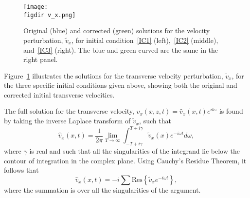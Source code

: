 \documentclass[12pt, draft]{../style-files/ociamthesis}
\begin{document}
%
\begin{figure}
	\texttt{[image: \\figdir v\_x.png]}
	\caption{Original \cite{rae_etal81} (blue) and corrected (green) solutions for the velocity perturbation, $\tilde{v}_x$, for initial condition~\ref{IC1} (left),~\ref{IC2} (middle), and~\ref{IC3} (right). The blue and green curved are the same in the right panel.}
	\label{fig: vx}
\end{figure}
Figure~\ref{fig: vx} illustrates the solutions for the transverse velocity perturbation, $\tilde{v}_x$, for the three specific initial conditions given above, showing both the original and corrected initial transverse velocities.

The full solution for the transverse velocity, $v_x(x, z, t) = \hat{v}_x(x,t)e^{ikz}$ is found by taking the inverse Laplace transform of $\tilde{v}_x$, such that
\begin{equation}
\hat{v}_x(x,t) = \frac{1}{2\pi} \lim_{T \to \infty} \int_{-T+ i\gamma}^{T + i\gamma} \tilde{v}_x(x)e^{-i\omega t} d\omega,
\end{equation}
where $\gamma$ is real and such that all the singularities of the integrand lie below the contour of integration in the complex plane. Using Cauchy's Residue Theorem, it follows that
\begin{equation}
\hat{v}_x(x, t) = -i\sum \mathrm{Res}\left\{\tilde{v}_xe^{-i\omega t}\right\},
\end{equation}
where the summation is over all the singularities of the argument.
\end{document}
